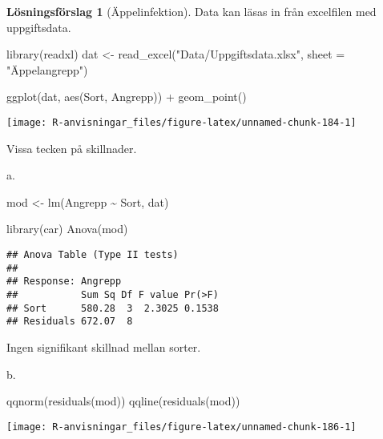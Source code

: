 \documentclass[
]{book}
\newenvironment{Shaded}{\begin{snugshade}}{\end{snugshade}}
\newcommand{\AttributeTok}[1]{\textcolor[rgb]{0.77,0.63,0.00}{#1}}
\newcommand{\FunctionTok}[1]{\textcolor[rgb]{0.00,0.00,0.00}{#1}}
\newcommand{\NormalTok}[1]{#1}
\newcommand{\OtherTok}[1]{\textcolor[rgb]{0.56,0.35,0.01}{#1}}
\newcommand{\SpecialCharTok}[1]{\textcolor[rgb]{0.00,0.00,0.00}{#1}}
\newcommand{\StringTok}[1]{\textcolor[rgb]{0.31,0.60,0.02}{#1}}
\theoremstyle{definition}
\theoremstyle{definition}
\theoremstyle{definition}
\theoremstyle{definition}
\newtheorem{hypothesis}{Lösningsförslag}[chapter]
\theoremstyle{remark}
\begin{document}
\begin{hypothesis}[Äppelinfektion]
Data kan läsas in från excelfilen med uppgiftsdata.

\begin{Shaded}
\begin{Highlighting}[]
\FunctionTok{library}\NormalTok{(readxl)}
\NormalTok{dat }\OtherTok{\textless{}{-}} \FunctionTok{read\_excel}\NormalTok{(}\StringTok{"Data/Uppgiftsdata.xlsx"}\NormalTok{, }\AttributeTok{sheet =} \StringTok{"Äppelangrepp"}\NormalTok{)}

\FunctionTok{ggplot}\NormalTok{(dat, }\FunctionTok{aes}\NormalTok{(Sort, Angrepp)) }\SpecialCharTok{+}
  \FunctionTok{geom\_point}\NormalTok{()}
\end{Highlighting}
\end{Shaded}

\begin{center}\texttt{[image: R-anvisningar\_files/figure-latex/unnamed-chunk-184-1]} \end{center}

Vissa tecken på skillnader.

a.

\begin{Shaded}
\begin{Highlighting}[]
\NormalTok{mod }\OtherTok{\textless{}{-}} \FunctionTok{lm}\NormalTok{(Angrepp }\SpecialCharTok{\textasciitilde{}}\NormalTok{ Sort, dat)}

\FunctionTok{library}\NormalTok{(car)}
\FunctionTok{Anova}\NormalTok{(mod)}
\end{Highlighting}
\end{Shaded}

\begin{verbatim}
## Anova Table (Type II tests)
## 
## Response: Angrepp
##           Sum Sq Df F value Pr(>F)
## Sort      580.28  3  2.3025 0.1538
## Residuals 672.07  8
\end{verbatim}

Ingen signifikant skillnad mellan sorter.

b.

\begin{Shaded}
\begin{Highlighting}[]
\FunctionTok{qqnorm}\NormalTok{(}\FunctionTok{residuals}\NormalTok{(mod))}
\FunctionTok{qqline}\NormalTok{(}\FunctionTok{residuals}\NormalTok{(mod))}
\end{Highlighting}
\end{Shaded}

\begin{center}\texttt{[image: R-anvisningar\_files/figure-latex/unnamed-chunk-186-1]} \end{center}


\end{hypothesis}
\end{document}
